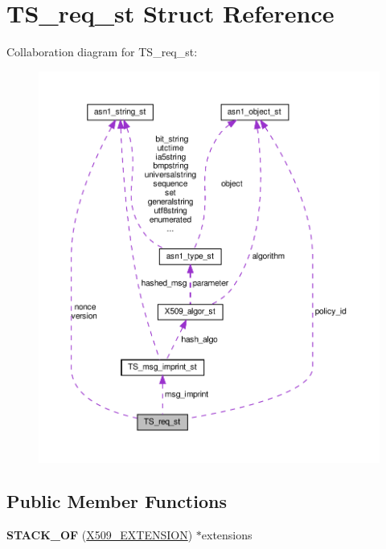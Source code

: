 \hypertarget{structTS__req__st}{}\section{T\+S\+\_\+req\+\_\+st Struct Reference}
\label{structTS__req__st}


Collaboration diagram for T\+S\+\_\+req\+\_\+st\+:
\nopagebreak
\begin{figure}[H]
\begin{center}
\leavevmode
\includegraphics[width=350pt]{structTS__req__st__coll__graph}
\end{center}
\end{figure}
\subsection*{Public Member Functions}
\begin{DoxyCompactItemize}
\item 
\mbox{\label{structTS__req__st_a3ac81ef0b6e4741d98a3ab19b46bb51b}} 
{\bfseries S\+T\+A\+C\+K\+\_\+\+OF} (\hyperlink{structX509__extension__st}{X509\+\_\+\+E\+X\+T\+E\+N\+S\+I\+ON}) $\ast$extensions
\end{DoxyCompactItemize}
